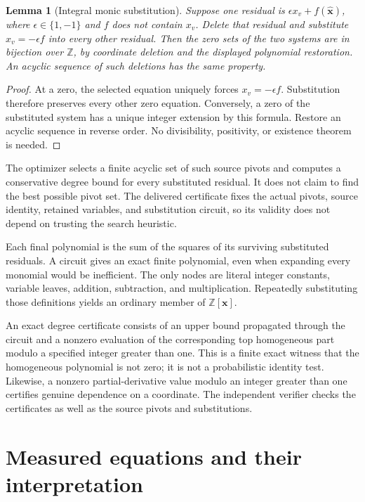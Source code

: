 \documentclass[11pt]{article}
\newtheorem{lemma}[theorem]{Lemma}
\theoremstyle{definition}\newtheorem{definition}[theorem]{Definition}
\newcommand{\Z}{\mathbb Z}\newcommand{\N}{\mathbb N}
\begin{document}
\begin{lemma}[Integral monic substitution]\label{lem:monic}
Suppose one residual is $\epsilon x_v+f(\widehat{\boldsymbol x})$,
where $\epsilon\in\{1,-1\}$ and $f$ does not contain $x_v$.
Delete that residual and substitute $x_v=-\epsilon f$ into every other
residual. Then the zero sets of the two systems are in bijection over
$\Z$, by coordinate deletion and the displayed polynomial restoration.
An acyclic sequence of such deletions has the same property.
\end{lemma}
\begin{proof}
At a zero, the selected equation uniquely forces $x_v=-\epsilon f$.
Substitution therefore preserves every other zero equation. Conversely,
a zero of the substituted system has a unique integer extension by this
formula. Restore an acyclic sequence in reverse order. No divisibility,
positivity, or existence theorem is needed.
\end{proof}

The optimizer selects a finite acyclic set of such source pivots and
computes a conservative degree bound for every substituted residual.
It does not claim to find the best possible pivot set. The delivered
certificate fixes the actual pivots, source identity, retained variables,
and substitution circuit, so its validity does not depend on trusting
the search heuristic.

Each final polynomial is the sum of the squares of its surviving
substituted residuals. A circuit gives an exact finite polynomial, even
when expanding every monomial would be inefficient. The only nodes are
literal integer constants, variable leaves, addition, subtraction, and
multiplication. Repeatedly substituting those definitions yields an
ordinary member of $\Z[\boldsymbol x]$.

An exact degree certificate consists of an upper bound propagated through
the circuit and a nonzero evaluation of the corresponding top homogeneous
part modulo a specified integer greater than one. This is a finite exact witness
that the homogeneous polynomial is not zero; it is not a probabilistic
identity test. Likewise, a nonzero partial-derivative value modulo an integer greater than one
certifies genuine dependence on a coordinate. The independent verifier
checks the certificates as well as the source pivots and substitutions.

\section{Measured equations and their interpretation}
\label{sec:results}
\end{document}
